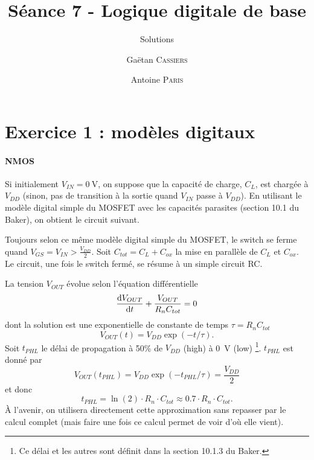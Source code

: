 \documentclass[frenchb,DIV=14]{scrartcl}
\title{Séance 7 - Logique digitale de base}
\subtitle{Solutions}
\author{\small Gaëtan \textsc{Cassiers} \and\small Antoine \textsc{Paris}}
\date{}
\begin{document}
\maketitle

\section*{Exercice 1 : modèles digitaux}
\paragraph{NMOS}
Si initialement $V_{IN} = \SI{0}{\volt}$, on suppose que la capacité de charge,
$C_L$, est chargée à $V_{DD}$ (sinon, pas de transition à la sortie quand $V_{IN}$
passe à $V_{DD}$). En utilisant le modèle digital simple du MOSFET avec les
capacités parasites (section 10.1 du Baker), on obtient le circuit suivant.

\begin{center}
\end{center}

Toujours selon ce même modèle digital simple du MOSFET, le switch se ferme
quand $V_{GS} = V_{IN} > \frac{V_{DD}}{2}$.
Soit $C_{tot} = C_L + C_{ox}$ la mise en parallèle de $C_L$ et $C_{ox}$. Le
circuit, une fois le switch fermé, se résume à un simple circuit RC.

\begin{center}
\end{center}

La tension $V_{OUT}$ évolue selon l'équation différentielle
\[ \frac{\operatorname{d}\! V_{OUT}}{\operatorname{d}\! t} + \frac{V_{OUT}}{R_nC_{tot}} = 0 \]
dont la solution est une exponentielle de constante de temps $\tau = R_nC_{tot}$
\[ V_{OUT}(t) = V_{DD}\exp\left(-t/\tau\right).\]
Soit $t_{PHL}$ le délai de propagation à 50\% de $V_{DD}$ (high) à \SI{0}{\volt} (low)
\footnote{Ce délai et les autres sont définit dans la section 10.1.3 du Baker.}.
$t_{PHL}$ est donné par
\[ V_{OUT}(t_{PHL}) = V_{DD}\exp\left(-t_{PHL}/\tau\right) = \frac{V_{DD}}{2} \]
et donc
\[ t_{PHL} = \ln(2)\cdot R_n\cdot C_{tot} \approx 0.7\cdot R_n\cdot C_{tot}. \]
\`{A} l'avenir, on utilisera directement cette approximation sans repasser par le calcul
complet (mais faire une fois ce calcul permet de voir d'où elle vient).
\end{document}
